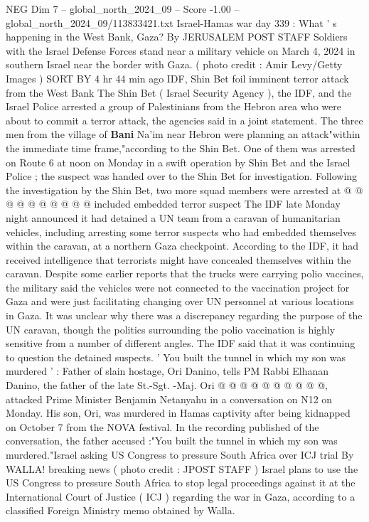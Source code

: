 \begin{textsample}{NEG Dim 7 – global\_north\_2024\_09 – Score -1.00 – global\_north\_2024\_09/113833421.txt}  \label{ex:f7_neg_379}
Israel-Hamas war day 339 : What ' s happening in the West Bank, Gaza?
By JERUSALEM POST STAFF Soldiers with the Israel Defense Forces stand near a military vehicle on March 4, 2024 in southern Israel near the border with Gaza. ( photo credit : Amir Levy/Getty Images ) SORT BY 4 hr 44 min ago IDF, Shin Bet foil imminent terror attack from the West Bank The Shin Bet ( Israel Security Agency ), the IDF, and the Israel Police arrested a group of Palestinians from the Hebron area who were about to commit a terror attack, the agencies said in a joint statement.
The three men from the village of \textbf{Bani} Na'im near Hebron were planning an attack"within the immediate time frame,"according to the Shin Bet.
One of them was arrested on Route 6 at noon on Monday in a swift operation by Shin Bet and the Israel Police ; the suspect was handed over to the Shin Bet for investigation.
Following the investigation by the Shin Bet, two more squad members were arrested at @ @ @ @ @ @ @ @ @ @ included embedded terror suspect The IDF late Monday night announced it had detained a UN team from a caravan of humanitarian vehicles, including arresting some terror suspects who had embedded themselves within the caravan, at a northern Gaza checkpoint.
According to the IDF, it had received intelligence that terrorists might have concealed themselves within the caravan.
Despite some earlier reports that the trucks were carrying polio vaccines, the military said the vehicles were not connected to the vaccination project for Gaza and were just facilitating changing over UN personnel at various locations in Gaza.
It was unclear why there was a discrepancy regarding the purpose of the UN caravan, though the politics surrounding the polio vaccination is highly sensitive from a number of different angles.
The IDF said that it was continuing to question the detained suspects. ' You built the tunnel in which my son was murdered ' : Father of slain hostage, Ori Danino, tells PM Rabbi Elhanan Danino, the father of the late St.-Sgt. -Maj.
Ori @ @ @ @ @ @ @ @ @ @, attacked Prime Minister Benjamin Netanyahu in a conversation on N12 on Monday.
His son, Ori, was murdered in Hamas captivity after being kidnapped on October 7 from the NOVA festival.
In the recording published of the conversation, the father accused :"You built the tunnel in which my son was murdered."Israel asking US Congress to pressure South Africa over ICJ trial By WALLA! breaking news ( photo credit : JPOST STAFF ) Israel plans to use the US Congress to pressure South Africa to stop legal proceedings against it at the International Court of Justice ( ICJ ) regarding the war in Gaza, according to a classified Foreign Ministry memo obtained by Walla.

\end{textsample}
